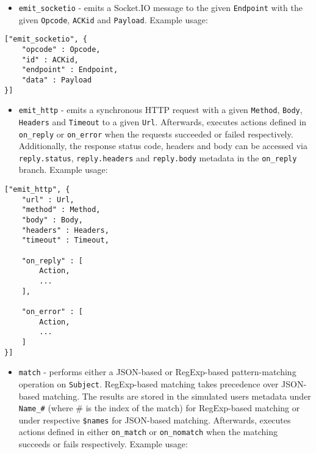 \documentclass[a4paper]{article}
\begin{document}
\begin{itemize}
\item \texttt{emit\_socketio} - emits a Socket.IO message to the given \texttt{Endpoint} with the given \texttt{Opcode}, \texttt{ACKid} and \texttt{Payload}. Example usage:
\end{itemize}

\begin{verbatim}
["emit_socketio", {
    "opcode" : Opcode,
    "id" : ACKid,
    "endpoint" : Endpoint,
    "data" : Payload
}]
\end{verbatim}





\begin{itemize}
\item \texttt{emit\_http} - emits a synchronous HTTP request with a given \texttt{Method}, \texttt{Body}, \texttt{Headers} and \texttt{Timeout} to a given \texttt{Url}. Afterwards, executes actions defined in \texttt{on\_reply} or \texttt{on\_error} when the requests succeeded or failed respectively. Additionally, the response status code, headers and body can be accessed via \texttt{reply.status}, \texttt{reply.headers} and \texttt{reply.body} metadata in the \texttt{on\_reply} branch. Example usage:
\end{itemize}

\begin{verbatim}
["emit_http", {
    "url" : Url,
    "method" : Method,
    "body" : Body,
    "headers" : Headers,
    "timeout" : Timeout,

    "on_reply" : [
        Action,
        ...
    ],

    "on_error" : [
        Action,
        ...
    ]
}]
\end{verbatim}





\begin{itemize}
\item \texttt{match} - performs either a JSON-based or RegExp-based pattern-matching operation on \texttt{Subject}. RegExp-based matching takes precedence over JSON-based matching. The results are stored in the simulated users metadata under \texttt{Name\_\#} (where \# is the index of the match) for RegExp-based matching or under respective \texttt{\$names} for JSON-based matching. Afterwards, executes actions defined in either \texttt{on\_match} or \texttt{on\_nomatch} when the matching succeeds or fails respectively. Example usage:
\end{itemize}
\end{document}
